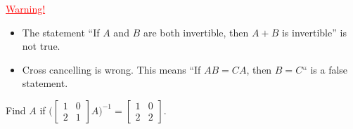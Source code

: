 \documentclass[20pt,a4paper]{extarticle}
\newcounter{example}
\begin{document}
\textcolor{red}{\underline{Warning!}}
	\begin{itemize}
		\item The statement ``If $A$ and $B$ are both invertible, then $A + B$ is invertible'' is not true.
		\item Cross cancelling is wrong. This means ``If $AB = CA$, then $B = C$`` is a false statement.
	\end{itemize}

\begin{comment}
\begin{proof}
\begin{enumerate}
	\item We have $I I = I$, so that $I$ is an inverse of $I$. But the inverse is unique, so $I^{-1} = I$.
	\item Since $A$ is invertible, we have that $A A^{-1} = A^{-1} A = I$. Let $B = A^{-1}$, we get that $BA = AB = I$, so that $B^{-1} = A$. Hence, $(A^{-1})^{-1} = A$.
	\item Assume that $A$ and $B$ are invertible. Then
		\[
			A A^{-1} = A^{-1} A = I \quad \text{ and } \quad B B^{-1} = B^{-1} B = I .
		\]
	Then, we have
		\[
			(AB) (B^{-1} A^{-1}) = A (B B^{-1}) A^{-1} = A I A^{-1} = A A^{-1} = I
		\]
	and
		\[
			(B^{-1} A^{-1}) AB = B^{-1} (A^{-1} A ) B = B^{-1} I B = B^{-1} B = I .
		\]
	Thus, $(AB)^{-1} = B^{-1} A^{-1}$.
	\item Assume that $A$ is invertible and $a \neq 0$. Then
		\[
			(aA) ( \tfrac{1}{a} A^{-1} ) = a (A \tfrac{1}{a} ) A^{-1} = (a \tfrac{1}{a} ) A A^{-1} = 1 I = I
		\]
	and also $(\frac{1}{a} A^{-1}) (aA ) = I$. Hence $(aA)^{-1} = \frac{1}{a} A^{-1}$.
	\item Assume that $A$ is invertible. Then
		\[
			A^\top (A^{-1})^\top = (A^{-1} A)^{\top} = I^\top = I
		\]
	and similarly, $(A^{-1})^\top A^\top = I$. Hence $(A^\top )^{-1} = (A^{-1})^\top$. \hfill $\square$
\end{enumerate}
\end{proof}
\end{comment}

\newpage 

\begin{example}
Find $A$ if $\Big( \begin{bmatrix} 1 & 0 \\ 2 & 1 \end{bmatrix} A\Big)^{-1} = \begin{bmatrix} 1 & 0 \\ 2 & 2 \end{bmatrix}$. 
\end{example}
\end{document}
